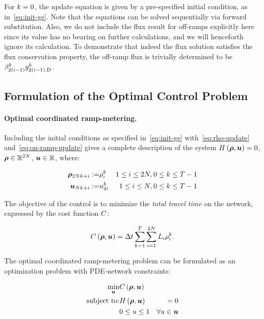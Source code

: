 For $k=0$, the update equation is given by a pre-specified initial
condition, as in~\eqref{eq:init-ge}. Note that the equations can
be solved sequentially via forward substitution. Also, we do not include
the flux result for off-ramps explicitly here since its value has no
bearing on further calculations, and we will henceforth ignore its
calculation. To demonstrate that indeed the flux solution satisfies
the flux conservation property, the off-ramp flux is trivially determined
to be $\beta_{2\left(i-1\right)}^{k}g_{2\left(i-1\right),\text{D}}^{k}$.


\subsection{Formulation of the Optimal Control Problem}


\paragraph{Optimal coordinated ramp-metering.}

Including the initial conditions as specified in~\eqref{eq:init-ge}
with~\eqref{eq:rho-update} and~\eqref{eq:on-ramp-update} gives
a complete description of the system $\sys\left(\state,\control\right)=0$,
$\state\in\mathbb{R}^{2\nlinks}$, $\control\in\mathbb{R}$, where:

\begin{eqnarray*}
\state_{2\nlinks\tind+\link}\defeq & \densitydiscrete{\link}{\tind} & 1\le i\le2\nlinks,0\le k\le T-1\\
\control_{\nlinks\tind+\link}\defeq & \ramp_{2\link}^{\tind} & 1\le i\le\nlinks,0\le k\le T-1
\end{eqnarray*}


The objective of the control is to minimize the \emph{total travel
time }on the network, expressed by the cost function $C$:

\[
\cost\left(\state,\control\right)=\Delta t\sum_{k=1}^{T}\sum_{i=1}^{2\nlinks}L_{i}\densitydiscrete{\link}{\tind}.
\]


The optimal coordinated ramp-metering problem can be formulated as
an optimization problem with PDE-network constraints:

\begin{eqnarray}
\min_{\control} & \cost\left(\state,\control\right)\label{eq:full}\\
\text{subject to:} & \sys\left(\state,\control\right) & =0\nonumber \\
& 0\le\convar\le1 & \forall\convar\in\control  \label{eq:box}
\end{eqnarray}


